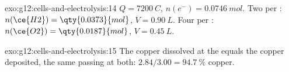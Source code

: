 \begin{solution}{exo:g12:cells-and-electrolysis:14}
$Q = \qty{7200}{C}$, $n(e^-) = \qty{0.0746}{mol}$. Two  per
: $n(\ce{H2}) = \qty{0.0373}{mol}$, $V = \qty{0.90}{L}$. Four per
: $n(\ce{O2}) = \qty{0.0187}{mol}$, $V = \qty{0.45}{L}$.
\end{solution}

\begin{solution}{exo:g12:cells-and-electrolysis:15}
The copper dissolved at the  equals the copper deposited, the same
 passing at both: $2.84/3.00 = \qty{94.7}{\percent}$ copper.
\end{solution}

